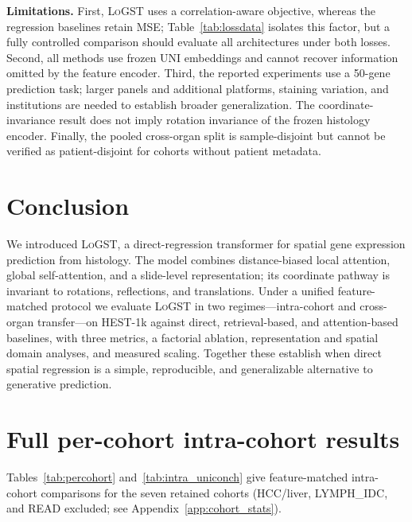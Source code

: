 \documentclass[10pt,twocolumn,letterpaper]{article}
\newcommand{\morph}{\textsc{LoGST}}
\begin{document}
\textbf{Limitations.} First, \morph{} uses a correlation-aware objective, whereas the regression
baselines retain MSE; Table~\ref{tab:lossdata} isolates this factor, but a fully controlled comparison
should evaluate all architectures under both losses. Second, all methods use frozen UNI embeddings and
cannot recover information omitted by the feature encoder. Third, the reported experiments use a
50-gene prediction task; larger panels and additional platforms, staining variation, and institutions
are needed to establish broader generalization. The coordinate-invariance result does not imply
rotation invariance of the frozen histology encoder. Finally, the pooled cross-organ split is
sample-disjoint but cannot be verified as patient-disjoint for cohorts without patient metadata.

\section{Conclusion}
We introduced \morph, a direct-regression transformer for spatial gene expression prediction from
histology. The model combines distance-biased local attention, global self-attention, and a
slide-level representation; its coordinate pathway is invariant to rotations, reflections, and translations. Under a
unified feature-matched protocol we evaluate \morph{} in two regimes---intra-cohort and cross-organ
transfer---on HEST-1k against direct, retrieval-based, and attention-based baselines,
with three metrics, a factorial ablation, representation and spatial domain analyses, and measured
scaling. Together these establish when direct spatial regression is a simple, reproducible, and
generalizable alternative to generative prediction.

\clearpage
\appendix


\section{Full per-cohort intra-cohort results}
Tables~\ref{tab:percohort} and~\ref{tab:intra_uniconch} give feature-matched
intra-cohort comparisons for the seven retained cohorts (HCC/liver, LYMPH\_IDC, and READ
excluded; see Appendix~\ref{app:cohort_stats}).
\end{document}

